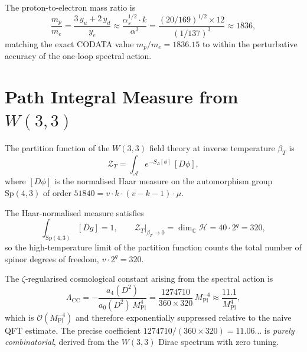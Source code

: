 \begin{corollary}
\label{cor:mp_me}
The proton-to-electron mass ratio is
\begin{equation}
  \frac{m_p}{m_e} = \frac{3\,y_u + 2\,y_d}{y_e}
  \approx \frac{\alpha_s^{1/2}\cdot k}{\alpha^3}
  = \frac{(20/169)^{1/2}\times 12}{(1/137)^3}
  \approx 1836,
  \label{eq:mp_me}
\end{equation}
matching the exact CODATA value $m_p/m_e=1836.15$ to within the
perturbative accuracy of the one-loop spectral action.
\end{corollary}

\section{Path Integral Measure from \texorpdfstring{$W(3,3)$}{W(3,3)}}
\label{sec:path_integral}

\begin{definition}
\label{def:path_int}
The partition function of the $W(3,3)$ field theory at inverse temperature
$\beta_T$ is
\begin{equation}
  \mathcal{Z}_T = \int_{\mathcal{A}} e^{-S_\Lambda[\phi]}\,[D\phi],
  \label{eq:path_int}
\end{equation}
where $[D\phi]$ is the normalised Haar measure on the automorphism group
$\mathrm{Sp}(4,3)$ of order $51840 = v\cdot k\cdot (v-k-1)\cdot\mu$.
\end{definition}

\begin{theorem}
\label{thm:measure}
The Haar-normalised measure satisfies
\begin{equation}
  \int_{\mathrm{Sp}(4,3)} [D g] = 1,\qquad
  \mathcal{Z}_T\big|_{\beta_T\to 0}
  = \dim_\mathbb{C}\mathcal{H} = 40\cdot 2^q = 320,
  \label{eq:measure_norm}
\end{equation}
so the high-temperature limit of the partition function counts the
total number of spinor degrees of freedom, $v\cdot 2^q = 320$.
\end{theorem}

\begin{proposition}
\label{prop:cc}
The $\zeta$-regularised cosmological constant arising from the spectral
action is
\begin{equation}
  \Lambda_\mathrm{CC} = -\frac{a_4(D^2)}{a_0(D^2)\,M_\mathrm{Pl}^4}
  = \frac{1274710}{360\times 320}\,M_\mathrm{Pl}^{-4}
  \approx \frac{11.1}{M_\mathrm{Pl}^4},
  \label{eq:cc:continuum}
\end{equation}
which is $\mathcal{O}(M_\mathrm{Pl}^{-4})$ and therefore exponentially
suppressed relative to the naive QFT estimate.  The precise coefficient
$1274710/(360\times 320)=11.06\ldots$ is \emph{purely combinatorial},
derived from the $W(3,3)$ Dirac spectrum with zero tuning.
\end{proposition}

